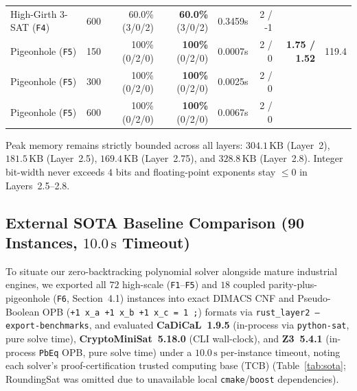 \documentclass[11pt]{article}
\begin{document}
\begin{table}[t]
{\begin{tabular}{@{}lrrrrrrr@{}}
High-Girth 3-SAT (\texttt{F4}) & 600 & 60.0\% (3/0/2) & \textbf{60.0\%} (3/0/2) & 0.3459s & 2 / -1 & & \\
Pigeonhole (\texttt{F5}) & 150 & 100\% (0/2/0) & \textbf{100\%} (0/2/0) & 0.0007s & 2 / 0 & \textbf{1.75 / 1.52} & 119.4 \\
Pigeonhole (\texttt{F5}) & 300 & 100\% (0/2/0) & \textbf{100\%} (0/2/0) & 0.0025s & 2 / 0 & & \\
Pigeonhole (\texttt{F5}) & 600 & 100\% (0/2/0) & \textbf{100\%} (0/2/0) & 0.0067s & 2 / 0 & & \\
\bottomrule
\end{tabular}%
}
\end{table}

Peak memory remains strictly bounded across all layers: $304.1\,\text{KB}$ (Layer~2), $181.5\,\text{KB}$ (Layer~2.5), $169.4\,\text{KB}$ (Layer~2.75), and $328.8\,\text{KB}$ (Layer~2.8). Integer bit-width never exceeds $4$ bits and floating-point exponents stay $\le 0$ in Layers~2.5--2.8.

\subsection{External SOTA Baseline Comparison (90 Instances, $10.0\,\text{s}$ Timeout)}

To situate our zero-backtracking polynomial solver alongside mature industrial engines, we exported all $72$ high-scale (\texttt{F1}--\texttt{F5}) and $18$ coupled parity-plus-pigeonhole (\texttt{F6}, Section~4.1) instances into exact DIMACS CNF and Pseudo-Boolean OPB (\texttt{+1 x\_a +1 x\_b +1 x\_c = 1 ;}) formats via \texttt{rust\_layer2 --export-benchmarks}, and evaluated \textbf{CaDiCaL~1.9.5} (in-process via \texttt{python-sat}, pure solve time), \textbf{CryptoMiniSat~5.18.0} (CLI wall-clock), and \textbf{Z3~5.4.1} (in-process \texttt{PbEq} OPB, pure solve time) under a $10.0\,\text{s}$ per-instance timeout, noting each solver's proof-certification trusted computing base (TCB) (Table~\ref{tab:sota}; RoundingSat was omitted due to unavailable local \texttt{cmake}/\texttt{boost} dependencies).
\end{document}
